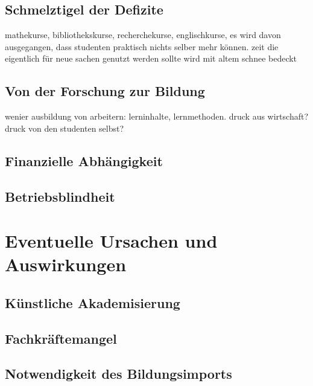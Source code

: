 \documentclass[a4paper,10pt,twoside,titlepage]{article}
\begin{document}
\subsection{Schmelztigel der Defizite}
mathekurse, bibliothekskurse, recherchekurse, englischkurse, es wird davon ausgegangen, dass studenten praktisch nichts selber mehr können. zeit die eigentlich für neue sachen genutzt werden sollte wird mit altem schnee bedeckt

\subsection{Von der Forschung zur Bildung}
wenier ausbildung von arbeitern: lerninhalte, lernmethoden. druck aus wirtschaft? druck von den studenten selbst?

\subsection{Finanzielle Abhängigkeit}
\subsection{Betriebsblindheit}

\section{Eventuelle Ursachen und Auswirkungen}

\subsection{Künstliche Akademisierung} 

\subsection{Fachkräftemangel}

\subsection{Notwendigkeit des Bildungsimports}
\end{document}
